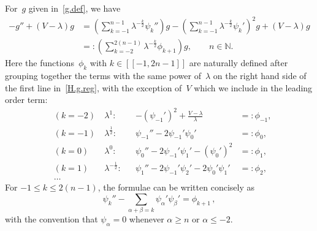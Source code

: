 For~$g$ given in~\eqref{g.def}, we have 
\begin{equation}\label{H.g.reg}
\begin{aligned}
-g'' + (V-\lambda)g &= 
\left( 
\sum_{k=-1}^{n-1} \lambda^{-\frac k2} \psi_k'' 
\right) g - 
\left( \sum_{k=-1}^{n-1} \lambda^{-\frac k2} \psi_k' 
\right)^2 g + (V - \lambda) g
\\
&=: \left( \sum_{k=-2}^{2(n-1)} \lambda^{-\frac{k}{2}} \phi_{k+1} \right) g,
\qquad n \in {\mathbb{N}}.
\end{aligned}  
\end{equation}
Here the functions~$\phi_k$ with $k \in [[-1,2n-1]] $ are naturally defined 
after grouping together the terms with the same power of~$\lambda$
on the right hand side of the first line in~\eqref{H.g.reg},
with the exception of~$V$ which we include in the leading order term:
\begin{equation}\label{scheme}
\begin{aligned}
&(k=-2) 
&\lambda^1: 
&  &- (\psi_{-1}')^2 + \frac{V - \lambda}{\lambda}  &=: \phi_{-1}, 
\\
&(k=-1) \ 
&\lambda^\frac12: &   &\psi_{-1}'' - 2\psi_{-1}' \psi_0' &=: \phi_0, 
\\ 
&(k=0) \ 
&\lambda^0: &  & \psi_0'' - 2\psi_{-1}' \psi_1' - (\psi_0')^2 &=: \phi_1,
\\
&(k=1) \ 
&\lambda^{-\frac 12}: & &   \psi_1'' - 2\psi_{-1}' \psi_2' - 2\psi_{0}' \psi_1' &= : \phi_2,
\\
&\dots
\end{aligned}
\end{equation}
For $-1 \leq k \leq 2(n-1)$, the formulae can be written concisely as  
\begin{equation}\label{binomial}
\psi_k'' - \sum_{\alpha+\beta=k} \psi_\alpha' \psi_\beta' = \phi_{k+1}
\,,
\end{equation}
with the convention that $\psi_\alpha=0$ 
whenever $\alpha \geq n$ or $\alpha \leq -2$.

